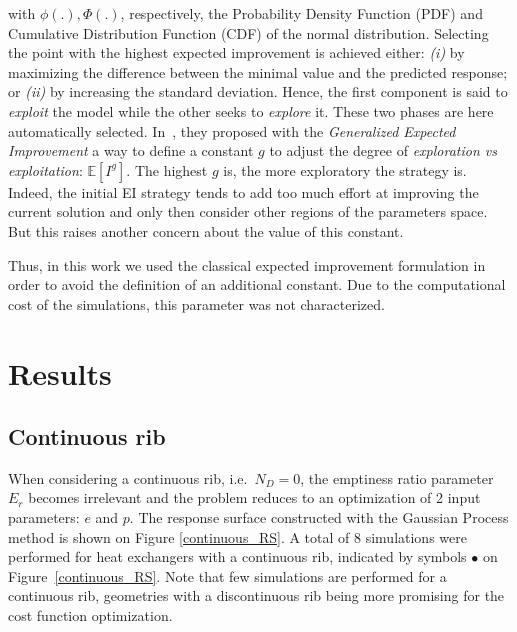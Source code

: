 \noindent with $\phi(.), \Phi(.)$, respectively, the Probability Density Function (PDF) and Cumulative Distribution Function (CDF) of the normal distribution. Selecting the point with the highest expected improvement is achieved either: \emph{(i)} by maximizing the difference between the minimal value and the predicted response; or \emph{(ii)} by increasing the standard deviation. Hence, the first component is said to \emph{exploit} the model while the other seeks to \emph{explore} it. These two phases are here automatically selected. In~\cite{schonlau1998}, they proposed with the \emph{Generalized Expected Improvement} a way to define a constant $g$ to adjust the degree of \emph{exploration vs exploitation}: $\mathbb{E}[I^g]$. The highest $g$ is, the more exploratory the strategy is. Indeed, the initial EI strategy tends to add too much effort at improving the current solution and only then consider other regions of the parameters space. But this raises another concern about the value of this constant.

Thus, in this work we used the classical expected improvement formulation in order to avoid the definition of an additional constant. Due to the computational cost of the simulations, this parameter was not characterized.

\section{Results}
\label{sec:results}

\subsection{Continuous rib}
\label{sec:continuous_rib}

When considering a continuous rib, i.e.~$N_D=0$, the emptiness ratio parameter $E_r$ becomes irrelevant and the problem reduces to an optimization of 2 input parameters: $e$ and $p$. The response surface constructed with the Gaussian Process method is shown on Figure \ref{continuous_RS}. A total of 8 simulations were performed for heat exchangers with a continuous rib, indicated by symbols $\bullet$ on Figure~\ref{continuous_RS}. Note that few simulations are performed for a continuous rib, geometries with a discontinuous rib being more promising for the cost function optimization.\\

